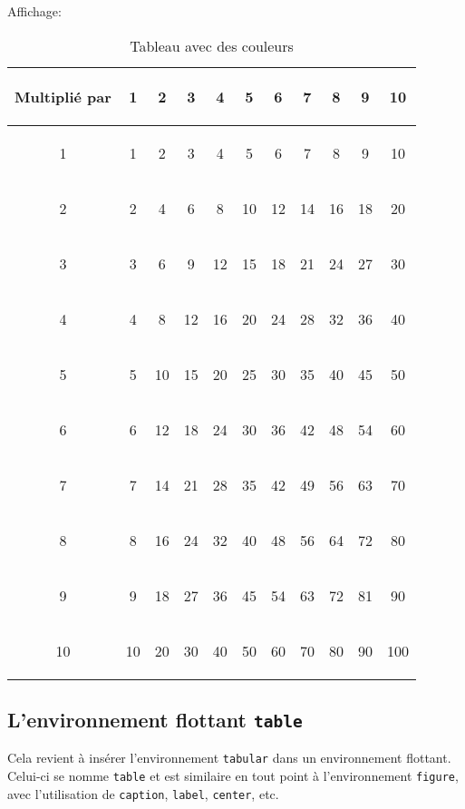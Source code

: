 Affichage:
\begin{table}[!h]
\begin{center}
\begin{tabular}{>{\begin{bf} \columncolor{yellow}} c <{\end{bf}}cccccccccc}
\hline  
\rowcolor{yellow}Multiplié par & \begin{bf}1\end{bf} & \begin{bf}2\end{bf} & \begin{bf}3\end{bf} & \begin{bf}4\end{bf} & \begin{bf}5\end{bf} & \begin{bf}6\end{bf} & \begin{bf}7\end{bf} & \begin{bf}8\end{bf} & \begin{bf}9\end{bf} & \begin{bf}10\end{bf} \\
\hline 
1 & 1 & 2 & 3 & 4 & 5 & 6 & 7 & 8 & 9 & 10 \\
\hline
2 & 2 & 4 & 6 & 8 & 10 & 12 & 14 & 16 & 18 & 20 \\
\hline
3 & 3 & 6 & 9 & 12 & 15 & 18 & 21 & 24 & 27 & 30 \\
\hline
4 & 4 & 8 & 12 & 16 & 20 & 24 & 28 & 32 & 36 & 40 \\
\hline
5 & 5 & 10 & 15 & 20 & 25 & 30 & 35 & 40 & 45 & 50 \\
\hline
6 & 6 & 12 & 18 & 24 & 30 & 36 & 42 & 48 & 54 & 60 \\
\hline
7 & 7 & 14 & 21 & 28 & 35 & 42 & 49 & 56 & 63 & 70 \\
\hline
8 & 8 & 16 & 24 & 32 & 40 & 48 & 56 & 64 & 72 & 80 \\
\hline
9 & 9 & 18 & 27 & 36 & 45 & 54 & 63 & 72 & 81 & 90 \\
\hline
10 & 10 & 20 & 30 & 40 & 50 & 60 & 70 & 80 & 90 & 100 \\
\hline
\end{tabular}
\caption{Tableau avec des couleurs}
\end{center}
\end{table}
\medskip

\subsection*{L'environnement flottant \texttt{table}}
Cela revient à insérer l'environnement \texttt{tabular} dans un environnement flottant. Celui-ci se nomme \texttt{table} et est similaire en tout point à l'environnement \texttt{figure}, avec l'utilisation de \texttt{caption}, \texttt{label}, \texttt{center}, etc.
\medskip
